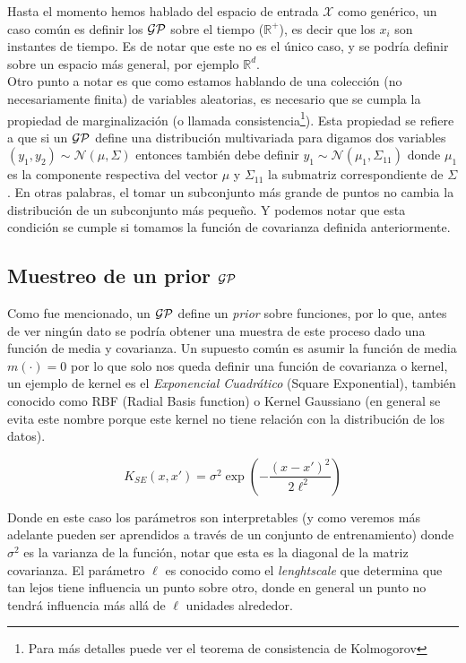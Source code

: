 Hasta el momento hemos hablado del espacio de entrada $\mathcal{X}$ como genérico, un caso común es definir los $\mathcal{GP}$ sobre el tiempo ($\mathbb{R}^{+}$), es decir que los $x_i$ son instantes de tiempo. Es de notar que este no es el único caso, y se podría definir sobre un espacio más general, por ejemplo $\mathbb{R}^d$.\\

Otro punto a notar es que como estamos hablando de una colección (no necesariamente finita) de variables aleatorias, es necesario que se cumpla la propiedad de marginalización (o llamada consistencia\footnote{Para más detalles puede ver el teorema de consistencia de Kolmogorov}). Esta propiedad se refiere a que si un $\mathcal{GP}$ define una distribución multivariada para digamos dos variables $(y_1, y_2) \sim \mathcal{N}(\mu, \Sigma)$ entonces también debe definir $y_1 \sim \mathcal{N}(\mu_1, \Sigma_{11})$ donde $\mu_1$ es la componente respectiva del vector $\mu$ y $\Sigma_{11}$ la submatriz correspondiente de $\Sigma$. En otras palabras, el tomar un subconjunto más grande de puntos no cambia la distribución de un subconjunto más pequeño. Y podemos notar que esta condición se cumple si tomamos la función de covarianza definida anteriormente.

\subsection{Muestreo de un prior \texorpdfstring{$\mathcal{GP}$}{GP}}

Como fue mencionado, un $\mathcal{GP}$ define un \textit{prior} sobre funciones, por lo que, antes de ver ningún dato se podría obtener una muestra de este proceso dado una función de media y covarianza. Un supuesto común es asumir la función de media $m(\cdot)=0$ por lo que solo nos queda definir una función de covarianza o kernel, un ejemplo de kernel es el \textit{Exponencial Cuadrático} (Square Exponential), también conocido como RBF (Radial Basis function) o Kernel Gaussiano (en general se evita este nombre porque este kernel no tiene relación con la distribución de los datos).

\begin{equation}
	K_{SE}(x, x') = \sigma^2 \exp\left( - \frac{\left( x- x'\right)^2}{2\ell^2} \right)
\end{equation}

Donde en este caso los parámetros son interpretables (y como veremos más adelante pueden ser aprendidos a través de un conjunto de entrenamiento) donde $\sigma^2$ es la varianza de la función, notar que esta es la diagonal de la matriz covarianza. El parámetro $\ell$ es conocido como el \textit{lenghtscale} que determina que tan lejos tiene influencia un punto sobre otro, donde en general un punto no tendrá influencia más allá de $\ell$ unidades alrededor.\\

